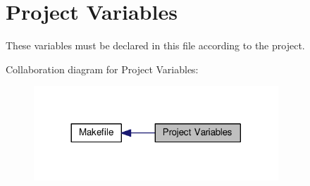 \hypertarget{group___project___variables}{\section{Project Variables}
\label{group___project___variables}
}


These variables must be declared in this file according to the project.  


Collaboration diagram for Project Variables\+:
\nopagebreak
\begin{figure}[H]
\begin{center}
\leavevmode
\includegraphics[width=260pt]{group___project___variables}
\end{center}
\end{figure}
